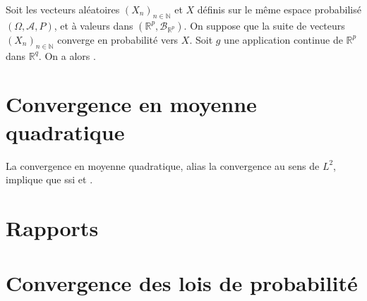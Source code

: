 \documentclass[10pt, french]{report}
\begin{document}
\begin{multicols*}{2}
\begin{definitionNOHFILL}
Soit les vecteurs aléatoires $(X_{n})_{n \in \mathbb{N}}$ et $X$ définis sur le même espace probabilisé $(\Omega, \mathcal{A}, P)$, et à valeurs dans $(\mathbb{R}^{p}, \mathcal{B}_{\mathbb{R}^{p}})$. On suppose que la suite de vecteurs $(X_{n})_{n \in \mathbb{N}}$ converge en probabilité vers $X$. Soit $g$ une application continue de $\mathbb{R}^{p}$ dans $\mathbb{R}^{q}$. On a alors .
\end{definitionNOHFILL}



\columnbreak
\section{Convergence en moyenne quadratique}
\begin{definitionNOHFILL}
La convergence en moyenne quadratique, alias la convergence au sens de $L^{2}$, implique que  ssi  et .
\end{definitionNOHFILL}




\section{Rapports}


\section{Convergence des lois de probabilité}

\end{multicols*}
\end{document}

